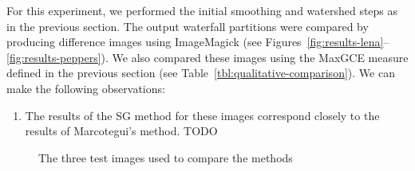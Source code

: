 \documentclass[preprint,a4paper]{elsarticle}
\newenvironment{stusubfig}[1]
{
	\begin{figure}[#1]
	\begin{center}
}
{
	\end{center}
	\end{figure}
}
\begin{document}
For this experiment, we performed the initial smoothing and watershed steps as in the previous section. The output waterfall partitions were compared by producing difference images using ImageMagick \cite{imagemagick} (see Figures~\ref{fig:results-lena}--\ref{fig:results-peppers}). We also compared these images using the MaxGCE measure defined in the previous section (see Table~\ref{tbl:qualitative-comparison}). We can make the following observations:
%
\begin{enumerate}

\item The results of the SG method for these images correspond closely to the results of Marcotegui's method. TODO

\end{enumerate}

\begin{stusubfig}{!t}
	\hspace{4mm}%
	\hspace{4mm}%
\caption{The three test images used to compare the methods}
\label{fig:testimages}
\end{stusubfig}
\end{document}

